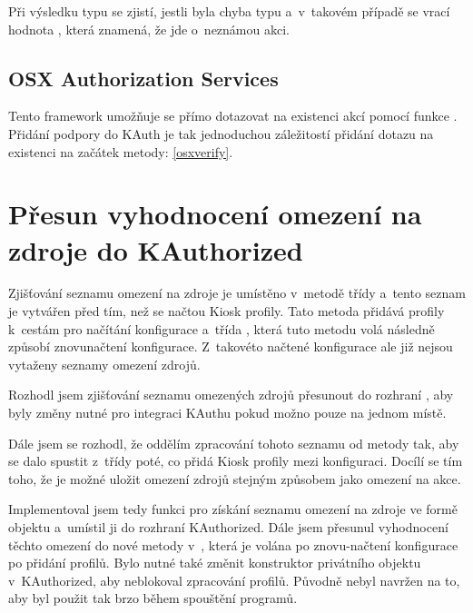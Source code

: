 Při výsledku typu  se zjistí, jestli byla chyba typu  a~v~takovém případě se vrací hodnota , která znamená, že jde o~neznámou akci.
\subsection*{OSX Authorization Services}
Tento framework umožňuje se přímo dotazovat na existenci akcí pomocí funkce \linebreak{}. Přidání podpory do KAuth je tak jednoduchou záležitostí přidání dotazu na existenci na začátek metody: \ref{osxverify}.

\section{Přesun vyhodnocení omezení na zdroje do KAuthorized}
Zjišťování seznamu omezení na zdroje je umístěno v~metodě  třídy  a~tento seznam je vytvářen před tím, než se načtou Kiosk profily. Tato metoda přidává profily k~cestám pro načítání konfigurace a~třída , která tuto metodu volá následně způsobí znovunačtení konfigurace. Z~takovéto načtené konfigurace ale již nejsou vytaženy seznamy omezení zdrojů.

Rozhodl jsem zjišťování seznamu omezených zdrojů přesunout do rozhraní , aby byly změny nutné pro integraci KAuthu pokud možno pouze na jednom místě.

Dále jsem se rozhodl, že oddělím zpracování tohoto seznamu od metody  tak, aby se dalo spustit z~třídy  poté, co  přidá Kiosk profily mezi konfiguraci. Docílí se tím toho, že je možné uložit omezení zdrojů stejným způsobem jako omezení na akce.

Implementoval jsem tedy funkci  pro získání seznamu omezení na zdroje ve formě objektu  a~umístil ji do rozhraní KAuthorized. Dále jsem přesunul vyhodnocení těchto omezení do nové metody \linebreak{} v~, která je volána po znovu-načtení konfigurace po přidání profilů. Bylo nutné také změnit konstruktor privátního objektu v~KAuthorized, aby neblokoval zpracování profilů. Původně nebyl navržen na to, aby byl použit tak brzo během spouštění programů.

